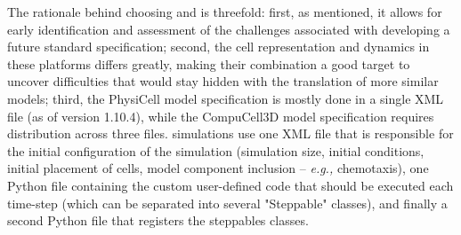 



The rationale behind choosing \pscs and \ccds is threefold: first, as mentioned, it allows for early identification and assessment of the challenges associated with developing a future standard specification; second, the cell representation and dynamics in these platforms differs greatly, making their combination a good target to uncover difficulties that would stay hidden with the translation of more similar models;
third, the PhysiCell model specification is mostly done in a single XML file (as of version 1.10.4), while the CompuCell3D model specification requires distribution across three files. \ccds simulations use one XML file that is responsible for the initial configuration of the simulation (simulation size, initial conditions, initial placement of cells, model component inclusion -- \textit{e.g.,} chemotaxis), one Python file containing the custom user-defined code that should be executed each time-step (which can be separated into several "Steppable" classes), and finally a second Python file that registers the steppables classes.

